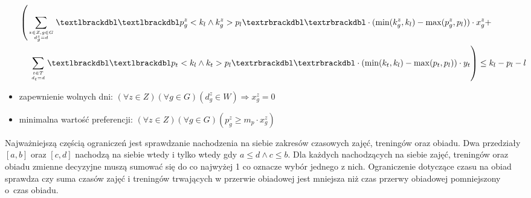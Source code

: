 \documentclass{article}
\begin{document}
\begin{itemize}
    \begin{equation}
        \begin{split}
            \left( \sum_{z \in Z, g \in G \atop d^z_g = d} \textlbrackdbl\textlbrackdbl p^z_g < k_l \land k^z_g > p_l \textrbrackdbl\textrbrackdbl \cdot (\min(k^z_g, k_l) - \max(p^z_g, p_l)) \cdot x^z_g + \quad \quad \quad \quad \right. \\ \left.
                   \sum_{t \in T \atop d_t = d} \textlbrackdbl\textlbrackdbl p_t < k_l \land k_t > p_l \textrbrackdbl\textrbrackdbl \cdot (\min(k_t, k_l) - \max(p_t, p_l)) \cdot y_t \right) \leq k_l - p_l - l
        \end{split}
        \end{equation}
    \item zapewnienie wolnych dni: $\displaystyle (\forall z \in Z)(\forall g \in G) \left(d^z_g \in W \right) \Rightarrow x^z_g = 0$
    \item minimalna wartość preferencji: $\displaystyle \left(\forall z \in Z\right) \left(\forall g \in G\right) \left(p^z_g \geq m_p \cdot x^z_g\right)$
\end{itemize}
Najważniejszą częścią ograniczeń jest sprawdzanie nachodzenia na siebie zakresów czasowych zajęć, treningów oraz obiadu. 
Dwa przedziały $[a,b]$ oraz $[c,d]$ nachodzą na siebie wtedy i tylko wtedy gdy $a \leq d \land c \leq b$.
Dla każdych nachodzących na siebie zajęć, treningów oraz obiadu zmienne decyzyjne muszą sumować się do co najwyżej 1 co oznacze wybór jednego z nich.
Ograniczenie dotyczące czasu na obiad sprawdza czy suma czasów zajęć i treningów trwających w przerwie obiadowej jest mniejsza niż czas przerwy obiadowej pomniejszony o~czas obiadu.
\end{document}

